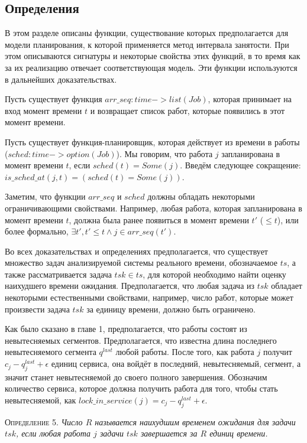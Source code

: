 \subsection{Определения}

В этом разделе описаны функции, существование которых предполагается для модели планирования, к которой применяется метод интервала занятости. При этом описываются сигнатуры и некоторые свойства этих функций, в то время как за их реализацию отвечает соответствующая модель. Эти функции используются в дальнейших доказательствах.

Пусть существует функция $arr\_seq: time -> list(Job)$, которая принимает на вход
  момент времени $t$ и возвращает список работ, которые появились в этот момент времени.

Пусть существует функция-планировщик, которая действует из времени в
  работы ($sched: time -> option(Job)$). Мы говорим, что работа $j$ запланирована
  в момент времени $t$, если $sched(t) = Some(j)$. Введём следующее сокращение:
  $is\_sched\_at(j,t) = (sched(t) = Some(j))$.

Заметим, что функции $arr\_seq$ и $sched$ должны обладать некоторыми ограничивающими свойствами.
  Например, любая работа, которая запланирована в момент времени $t$,
  должна была ранее появиться в момент времени $t'$ ($\leq t$), или более формально, $\exists t', t' \leq t \wedge j \in arr\_seq (t')$.


Во всех доказательствах и определениях предполагается, что существует множество
  задач анализируемой системы реального времени, обозначаемое $ts$,
  а также рассматривается задача $tsk \in ts$, для которой необходимо
  найти оценку наихудшего времени ожидания. Предполагается, что любая задача из $tsk$
  обладает некоторыми естественными свойствами, например, число работ, которые может
  произвести задача $tsk$ за единицу времени, должно быть ограничено.

Как было сказано в главе 1, предполагается, что работы состоят из невытесняемых сегментов.
  Предполагается, что известна длина последнего невытесняемого сегмента $q^{last}$ любой работы.
  После того, как работа $j$ получит $c_{j} - q_j^{last} + \epsilon$ единиц сервиса,
  она войдёт в последний, невытесняемый, сегмент, а значит станет невытесняемой
  до своего полного завершения. Обозначим количество сервиса, которое должна получить работа для того,
  чтобы стать невытесняемой, как $lock\_in\_service(j) = c_{j} - q_j^{last} + \epsilon$.

\textsc{Определение 5.}
\textit{Число $R$ называется наихудшим временем ожидания для задачи $tsk$, если
  любая работа $j$ задачи $tsk$ завершается за $R$ единиц времени.}

